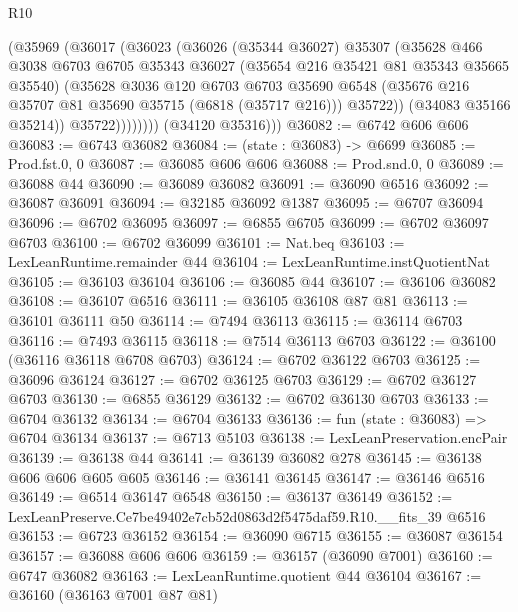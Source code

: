 \begin{lexlean}{R10}
\begin{coremodule}
                  (@35969
                    (@36017
                      (@36023
                        (@36026
                          (@35344 @36027)
                          @35307
                          (@35628
                            @466
                            @3038
                            @6703
                            @6705
                            @35343
                            @36027
                            (@35654 @216 @35421 @81 @35343 @35665 @35540)
                            (@35628
                              @3036
                              @120
                              @6703
                              @6703
                              @35690
                              @6548
                              (@35676 @216 @35707 @81 @35690 @35715 (@6818 (@35717 @216)))
                              @35722))
                          (@34083 @35166 @35214))
                        @35722))))))))
        (@34120 @35316)))
@36082 := @6742 @606 @606
@36083 := @6743 @36082
@36084 := (state : @36083) -> @6699
@36085 := Prod.fst.{0, 0}
@36087 := @36085 @606 @606
@36088 := Prod.snd.{0, 0}
@36089 := @36088 @44
@36090 := @36089 @36082
@36091 := @36090 @6516
@36092 := @36087 @36091
@36094 := @32185 @36092 @1387
@36095 := @6707 @36094
@36096 := @6702 @36095
@36097 := @6855 @6705
@36099 := @6702 @36097 @6703
@36100 := @6702 @36099
@36101 := Nat.beq
@36103 := LexLeanRuntime.remainder @44
@36104 := LexLeanRuntime.instQuotientNat
@36105 := @36103 @36104
@36106 := @36085 @44
@36107 := @36106 @36082
@36108 := @36107 @6516
@36111 := @36105 @36108 @87 @81
@36113 := @36101 @36111 @50
@36114 := @7494 @36113
@36115 := @36114 @6703
@36116 := @7493 @36115
@36118 := @7514 @36113 @6703
@36122 := @36100 (@36116 @36118 @6708 @6703)
@36124 := @6702 @36122 @6703
@36125 := @36096 @36124
@36127 := @6702 @36125 @6703
@36129 := @6702 @36127 @6703
@36130 := @6855 @36129
@36132 := @6702 @36130 @6703
@36133 := @6704 @36132
@36134 := @6704 @36133
@36136 := fun (state : @36083) => @6704 @36134
@36137 := @6713 @5103
@36138 := LexLeanPreservation.encPair
@36139 := @36138 @44
@36141 := @36139 @36082 @278
@36145 := @36138 @606 @606 @605 @605
@36146 := @36141 @36145
@36147 := @36146 @6516
@36149 := @6514 @36147 @6548
@36150 := @36137 @36149
@36152 := LexLeanPreserve.Ce7be49402e7cb52d0863d2f5475daf59.R10.__fits_39 @6516
@36153 := @6723 @36152
@36154 := @36090 @6715
@36155 := @36087 @36154
@36157 := @36088 @606 @606
@36159 := @36157 (@36090 @7001)
@36160 := @6747 @36082
@36163 := LexLeanRuntime.quotient @44 @36104
@36167 := @36160 (@36163 @7001 @87 @81)

\end{coremodule}
\end{lexlean}
